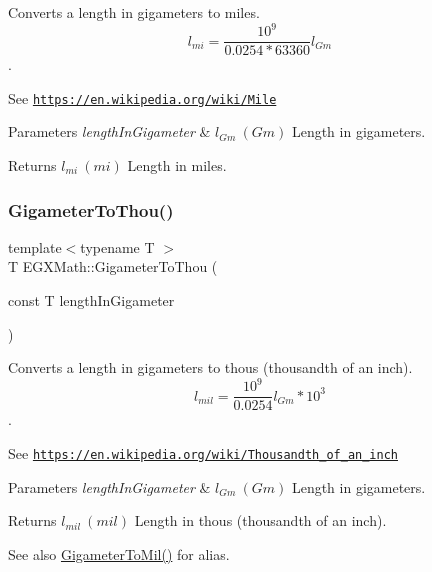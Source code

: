 Converts a length in gigameters to miles. \[ l_{mi}=\frac{10^{9}}{0.0254 * 63360} l_{Gm} \]. 

See \href{https://en.wikipedia.org/wiki/Mile}{\tt https\+://en.\+wikipedia.\+org/wiki/\+Mile} 
\begin{DoxyParams}{Parameters}
{\em length\+In\+Gigameter} & $ l_{Gm}\ (Gm)$ Length in gigameters. \\
\hline
\end{DoxyParams}
\begin{DoxyReturn}{Returns}
$ l_{mi}\ (mi)$ Length in miles. 
\end{DoxyReturn}
\mbox{\label{group___e_g_x_math-_conversions-_length_conversions-_s_i-_gigameter-_imperial_ga94fd906264f882396dc438a684e22b41}} 
\subsubsection{\texorpdfstring{Gigameter\+To\+Thou()}{GigameterToThou()}}
{\footnotesize\ttfamily template$<$typename T $>$ \\
T E\+G\+X\+Math\+::\+Gigameter\+To\+Thou (\begin{DoxyParamCaption}\item[{const T}]{length\+In\+Gigameter }\end{DoxyParamCaption})}



Converts a length in gigameters to thous (thousandth of an inch). \[ l_{mil}= \frac{10^{9}}{0.0254} l_{Gm} * 10^{3} \]. 

See \href{https://en.wikipedia.org/wiki/Thousandth_of_an_inch}{\tt https\+://en.\+wikipedia.\+org/wiki/\+Thousandth\+\_\+of\+\_\+an\+\_\+inch} 
\begin{DoxyParams}{Parameters}
{\em length\+In\+Gigameter} & $ l_{Gm}\ (Gm)$ Length in gigameters. \\
\hline
\end{DoxyParams}
\begin{DoxyReturn}{Returns}
$ l_{mil}\ (mil)$ Length in thous (thousandth of an inch). 
\end{DoxyReturn}
\begin{DoxySeeAlso}{See also}
\mbox{\hyperlink{group___e_g_x_math-_conversions-_length_conversions-_s_i-_gigameter-_imperial_ga498a43d44c0c0f6527362688d6cc361f}{Gigameter\+To\+Mil()}} for alias. 
\end{DoxySeeAlso}
\mbox{\label{group___e_g_x_math-_conversions-_length_conversions-_s_i-_gigameter-_imperial_gadc687ba83985120ec09d825adace01d6}} 

